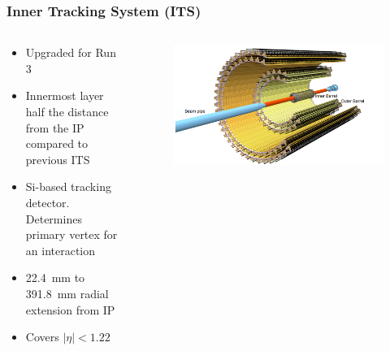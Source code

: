 \documentclass[11pt]{beamer}
\begin{document}
\begin{frame}
    \frametitle{Inner Tracking System (ITS)}

    \begin{columns}[c]
        \begin{column}{0.4\textwidth}
            \begin{itemize}
                \item Upgraded for Run 3
                \item Innermost layer half the distance from the IP compared to previous ITS
                \item Si-based tracking detector. Determines primary vertex for an interaction
                \item \SI{22.4}{\milli\metre} to \SI{391.8}{\milli\metre} radial extension from IP
                \item Covers $|\eta| < 1.22$
            \end{itemize}
        \end{column}

        \begin{column}{0.6\textwidth}
            \begin{figure}[h]
                \begin{center}
                    \includegraphics[width=\textwidth]{Figs/ITS_Schematic.png}
                \end{center}
            \end{figure}
        \end{column}
    \end{columns}

\end{frame}
\end{document}

